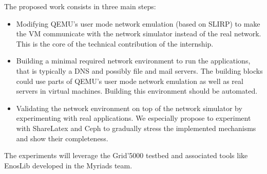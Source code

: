 \documentclass[a4paper,11pt]{article}
\begin{document}
The proposed work consists in three main steps:
\begin{itemize}
\item Modifying QEMU's user mode network emulation (based on SLIRP) to make the VM
communicate with the network simulator instead of the real network. This is the
core of the technical contribution of the internship.
\item Building a minimal required network environment to run the applications, that is typically a DNS and possibly file and mail servers. The building blocks could use parts of QEMU's user mode network emulation as well as real servers in virtual machines. Building this environment should be automated.
\item Validating the network environment on top of the network simulator by experimenting with real applications. We especially propose to experiment with ShareLatex and Ceph to gradually stress the implemented mechanisms and show their completeness.
\end{itemize}
The experiments will leverage the Grid'5000 testbed and associated tools like EnosLib developed in the Myriads team.

%
\end{document}
